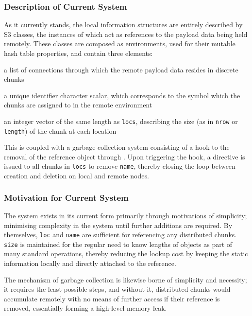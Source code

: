 \subsubsection{Description of Current System}\label{description-of-current-system}

As it currently stands, the local information structures are entirely described by S3 classes, the instances of which act as references to the payload data being held remotely.
These classes are composed as environments, used for their mutable hash table properties, and contain three elements:

\begin{description} \tightlist
\item[\texttt{locs}] a list of  connections through which the remote payload data resides in discrete chunks
\item[\texttt{name}] a unique identifier character scalar, which corresponds to the symbol which the chunks are assigned to in the remote environment
\item[\texttt{size}] an integer vector of the same length as \texttt{locs}, describing the size (as in \texttt{nrow} or \texttt{length}) of the chunk at each location
\end{description}

This is coupled with a garbage collection system consisting of a hook to the removal of the reference object through .
Upon triggering the hook, a directive is issued to all chunks in \texttt{locs} to remove \texttt{name}, thereby closing the loop between creation and deletion on local and remote nodes.

\subsubsection{Motivation for Current System}\label{motivation-for-current-system}

The system exists in its current form primarily through motivations of simplicity; minimising complexity in the system until further additions are required.
By themselves, \texttt{loc} and \texttt{name} are sufficient for referencing any distributed chunks.
\texttt{size} is
maintained for the regular need to know lengths of objects as part of
many standard operations, thereby reducing the lookup cost by keeping
the static information locally and directly attached to the reference.

The mechanism of garbage collection is likewise borne of simplicity and necessity; it requires the least possible steps, and without it, distributed chunks would accumulate remotely with no means of further access if their reference is removed, essentially forming a high-level memory leak.

